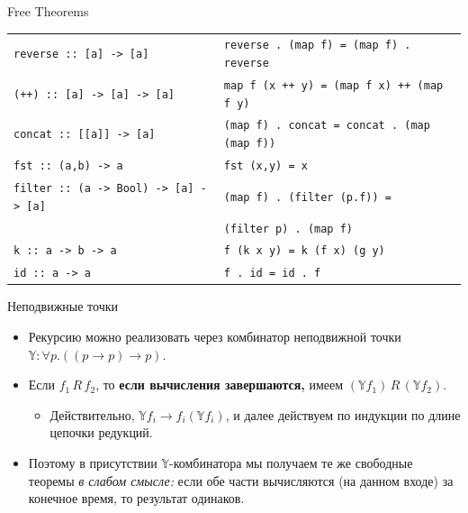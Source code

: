 \documentclass[xcolor=dvipsnames]{beamer}
\newcommand{\Yb}{\mathbb{Y}}
\begin{document}
\begin{frame}[t]{Free Theorems}



\footnotesize\noindent
\hspace*{-2em}
\begin{tabular}{l@{\quad}|@{\quad}l}
 \texttt
 {reverse :: [a] -> [a]}
 &
 \texttt
 {reverse . (map f) = (map f) . reverse} \\
 \texttt
 {(++) :: [a] -> [a] -> [a]} 
 &
 \texttt
 {map f (x ++ y) = (map f x) ++ (map f y)} \\
 \texttt
 {concat :: [[a]] -> [a]}
 &
 \texttt
 {(map f) . concat = 
 concat . (map (map f))} \\
 \texttt
 {fst :: (a,b) -> a} &
 \texttt
 {fst (x,y) = x} \\
 \texttt
 {filter :: (a -> Bool) -> [a] -> [a]} &
 \texttt
 {(map f) . (filter (p.f)) =}
 \\ & \hspace*{2em} \texttt{(filter p) . (map f)} \\
 \texttt
 {k :: a -> b -> a} &
 \texttt{f (k x y) = k (f x) (g y)} \\
 \texttt 
 {id :: a -> a} &
 \texttt 
 {f . id = id . f}
\end{tabular}


\end{frame}


\begin{frame}{Неподвижные точки}

\begin{itemize}[<+->]
 \item Рекурсию можно реализовать через комбинатор неподвижной точки 
 $\Yb : \forall p. ((p \to p) \to p)$.
 \item Если $f_1 \, R \, f_2$, то 
 {\bf если вычисления завершаются,} 
 имеем $(\Yb f_1) \, R \, (\Yb f_2)$.
 \begin{itemize}
 \item Действительно, $\Yb f_i \to f_i (\Yb f_i)$, и далее действуем по индукции по длине цепочки редукций.
 \end{itemize}
 \item Поэтому в присутствии $\Yb$-комбинатора мы получаем те же свободные теоремы {\em в слабом смысле:} если обе части вычисляются (на данном входе) за конечное время, то результат одинаков.
\end{itemize}

 
\end{frame}
\end{document}
